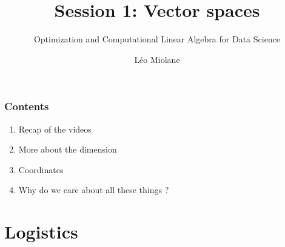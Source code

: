 \documentclass{beamer}
\title{Session 1: Vector spaces}
\subtitle{Optimization and Computational Linear Algebra for Data Science}
\author{Léo Miolane}
\date{}
\begin{document}
\setcounter{showProgressBar}{0}
\setcounter{showSlideNumbers}{0}

\frame{\titlepage}

\begin{frame}
	\frametitle{Contents}
	\begin{enumerate}
		\item Recap of the videos
		\item More about the dimension
		\item Coordinates
		\item Why do we care about all these things ? 
	\end{enumerate}
\end{frame}


\setcounter{framenumber}{0}
\setcounter{showSlideNumbers}{1}

\section{Logistics}
\end{document}
